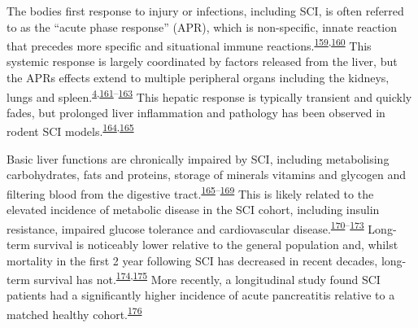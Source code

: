 \documentclass[
]{article}
\begin{document}
The bodies first response to injury or infections, including SCI, is often referred to as the ``acute phase response'' (APR), which is non-specific, innate reaction that precedes more specific and situational immune reactions.\textsuperscript{\protect\hyperlink{ref-gordon_acute-phase_1985}{159},\protect\hyperlink{ref-gruys_acute_2005}{160}}
This systemic response is largely coordinated by factors released from the liver, but the APRs effects extend to multiple peripheral organs including the kidneys, lungs and spleen.\textsuperscript{\protect\hyperlink{ref-gris_systemic_2008}{4},\protect\hyperlink{ref-bao_systemic_2012}{161}--\protect\hyperlink{ref-fleming_remote_2012}{163}}
This hepatic response is typically transient and quickly fades, but prolonged liver inflammation and pathology has been observed in rodent SCI models.\textsuperscript{\protect\hyperlink{ref-goodus_dietary_2018}{164},\protect\hyperlink{ref-sauerbeck_spinal_2015}{165}}

Basic liver functions are chronically impaired by SCI, including metabolising carbohydrates, fats and proteins, storage of minerals vitamins and glycogen and filtering blood from the digestive tract.\textsuperscript{\protect\hyperlink{ref-sauerbeck_spinal_2015}{165}--\protect\hyperlink{ref-chow_pharmacology_2012}{169}}
This is likely related to the elevated incidence of metabolic disease in the SCI cohort, including insulin resistance, impaired glucose tolerance and cardiovascular disease.\textsuperscript{\protect\hyperlink{ref-bauman_carbohydrate_2001}{170}--\protect\hyperlink{ref-myers_cardiovascular_2007}{173}}
Long-term survival is noticeably lower relative to the general population and, whilst mortality in the first 2 year following SCI has decreased in recent decades, long-term survival has not.\textsuperscript{\protect\hyperlink{ref-strauss_trends_2006}{174},\protect\hyperlink{ref-shavelle_improvements_2015}{175}}
More recently, a longitudinal study found SCI patients had a significantly higher incidence of acute pancreatitis relative to a matched healthy cohort.\textsuperscript{\protect\hyperlink{ref-ho_increased_2021}{176}}
\end{document}
